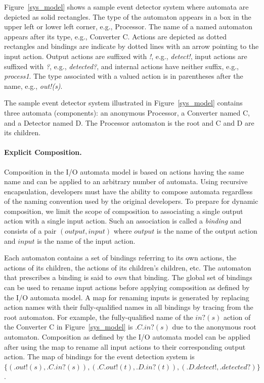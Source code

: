 Figure~\ref{sys_model} shows a sample event detector system where automata are depicted as solid rectangles.
The type of the automaton appears in a box in the upper left or lower left corner, e.g., Processor.
The name of a named automaton appears after its type, e.g., Converter C.
Actions are depicted as dotted rectangles and bindings are indicate by dotted lines with an arrow pointing to the input action.
Output actions are suffixed with \emph{!}, e.g., \emph{detect!}, input actions are suffixed with \emph{?}, e.g., \emph{detected?}, and internal actions have neither suffix, e.g., \emph{process1}.
The type associated with a valued action is in parentheses after the name, e.g., \emph{out!(s)}.

The sample event detector system illustrated in Figure~\ref{sys_model} contains three automata (components):  an anonymous Processor, a Converter named C, and a Detector named D.
The Processor automaton is the root and C and D are its children.

\paragraph{Explicit Composition.}
Composition in the I/O automata model is based on actions having the same name and can be applied to an arbitrary number of automata.
Using recursive encapsulation, developers must have the ability to compose automata regardless of the naming convention used by the original developers.
To prepare for dynamic composition, we limit the scope of composition to associating a single output action with a single input action.
Such an association is called a \emph{binding} and consists of a pair $(output, input)$ where $output$ is the name of the output action and $input$ is the name of the input action.

Each automaton contains a set of bindings referring to its own actions, the actions of its children, the actions of its children's children, etc.
The automaton that prescribes a binding is said to \emph{own} that binding.
The global set of bindings can be used to rename input actions before applying composition as defined by the I/O automata model.
A map for renaming inputs is generated by replacing action names with their fully-qualified names in all bindings by tracing from the root automaton.
For example, the fully-qualified name of the $in?(s)$ action of the Converter C in Figure~\ref{sys_model} is $.C.in?(s)$ due to the anonymous root automaton.
Composition as defined by the I/O automata model can be applied after using the map to rename all input actions to their corresponding output action.
The map of bindings for the event detection system is $\{ (.out!(s), .C.in?(s)), (.C.out!(t), .D.in?(t)), (.D.detect!, .detected?) \}$.

